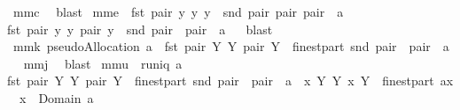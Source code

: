 \begin{isabellebody}
%
\isadelimproof
%
\endisadelimproof
%
\isatagproof
{}\isamarkupfalse%
\ mm{}{}c\ \isamarkupfalse%
\ blast%
\endisatagproof
{\isafoldproof}%
%
\isadelimproof
\isanewline
%
\endisadelimproof
{}\isamarkupfalse%
\ mm{}{}e{\isacharcolon}\ {\isachardoublequoteopen}{\isasymUnion}\ {\isacharbraceleft}{\isacharbraceleft}{\isacharparenleft}fst\ pair{\isacharcomma}\ {\isacharbraceleft}y{\isacharbraceright}{\isacharparenright}{\isacharbar}\ y{\isachardot}\ y\ {\isasymin}\ snd\ pair{\isacharbraceright}{\isacharbar}\ pair{\isachardot}\ pair\ {\isasymin}\ a{\isacharbraceright}{\isacharequal}\isanewline
{\isacharbraceleft}{\isacharparenleft}fst\ pair{\isacharcomma}\ {\isacharbraceleft}y{\isacharbraceright}{\isacharparenright}{\isacharbar}\ y\ pair{\isachardot}\ y\ {\isasymin}\ snd\ pair\ {\isacharampersand}\ pair\ {\isasymin}\ a{\isacharbraceright}{\isachardoublequoteclose}%
\isadelimproof
\ %
\endisadelimproof
%
\isatagproof
{}\isamarkupfalse%
\ blast%
\endisatagproof
{\isafoldproof}%
%
\isadelimproof
%
\endisadelimproof
\isanewline
\isanewline
{}\isamarkupfalse%
\ mm{}{}k{\isacharcolon}\ {\isachardoublequoteopen}pseudoAllocation\ a\ {\isacharequal}\ {\isacharbraceleft}{\isacharparenleft}fst\ pair{\isacharcomma}\ Y{\isacharparenright}{\isacharbar}\ Y\ pair{\isachardot}\ Y\ {\isasymin}\ finestpart\ {\isacharparenleft}snd\ pair{\isacharparenright}\ {\isacharampersand}\ pair\ {\isasymin}\ a{\isacharbraceright}{\isachardoublequoteclose}\ \isanewline
%
\isadelimproof
%
\endisadelimproof
%
\isatagproof
{}\isamarkupfalse%
\ mm{}{}j\ \isamarkupfalse%
\ blast%
\endisatagproof
{\isafoldproof}%
%
\isadelimproof
\isanewline
%
\endisadelimproof
\isanewline
{}\isamarkupfalse%
\ mm{}{}u{\isacharcolon}\ \ {\isachardoublequoteopen}runiq\ a{\isachardoublequoteclose}\ \ \isanewline
{\isachardoublequoteopen}{\isacharbraceleft}{\isacharparenleft}fst\ pair{\isacharcomma}\ Y{\isacharparenright}{\isacharbar}\ Y\ pair{\isachardot}\ Y\ {\isasymin}\ finestpart\ {\isacharparenleft}snd\ pair{\isacharparenright}\ {\isacharampersand}\ pair\ {\isasymin}\ a{\isacharbraceright}\ {\isacharequal}\ {\isacharbraceleft}{\isacharparenleft}x{\isacharcomma}\ Y{\isacharparenright}{\isacharbar}\ Y\ x{\isachardot}\ Y\ {\isasymin}\ finestpart\ {\isacharparenleft}a{\isacharcomma}{\isacharcomma}x{\isacharparenright}\ {\isacharampersand}\ x\ {\isasymin}\ Domain\ a{\isacharbraceright}{\isachardoublequoteclose}\isanewline

\end{isabellebody}
